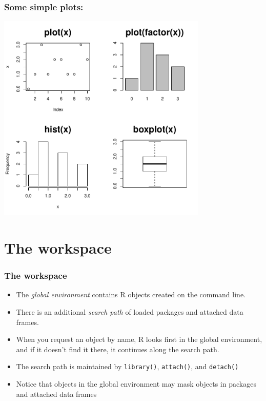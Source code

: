 \documentclass[xcolor=svgnames,handout]{beamer}
\newcommand{\code}[1]{\texttt{#1}}
\begin{document}
\begin{frame}[fragile]
\frametitle{Some simple plots:}
\includegraphics[width=0.75\textwidth]{spe_intro_plots}
\end{frame}



\section{The workspace}

\begin{frame}{}
  \frametitle{The workspace}
  \begin{itemize}
  \item The \emph{global environment} contains R objects created on the
    command line. 
  \item There is an additional \emph{search path} of loaded packages
    and attached data frames.
  \item When you request an object by name, R looks first in the
    global environment, and if it doesn't find it there, it continues
    along the search path.
  \item The search path is maintained by \code{library()},
    \code{attach()}, and \code{detach()}
  \item Notice that objects in the global environment may mask objects
    in packages and attached data frames
  \end{itemize}
\end{frame}
\end{document}

